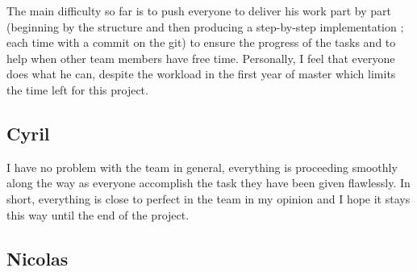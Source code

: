 The main difficulty so far is to push everyone to deliver his work part by
part (beginning by the structure and then producing a step-by-step
implementation ; each time with a commit on the git) to ensure the progress
of the tasks and to help when other team members have free time.
Personally, I feel that everyone does what he can, despite the workload in
the first year of master which limits the time left for this project.\newline
\subsection{Cyril}

I have no problem with the team in general, everything is proceeding
smoothly along the way as everyone accomplish the task they have been given
flawlessly. In short, everything is close to perfect in the team in my
opinion and I hope it stays this way until the end of the project.
\subsection{Nicolas}
